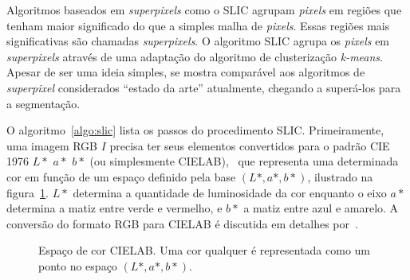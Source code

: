 Algoritmos baseados em \textit{superpixels} como o SLIC agrupam \textit{pixels} em
regiões que tenham maior significado do que a simples malha de
\textit{pixels}. Essas regiões mais significativas são chamadas \textit{superpixels}. O
algoritmo SLIC agrupa os \textit{pixels} em \textit{superpixels}
através de uma adaptação do algoritmo de
clusterização \emph{k-means}. Apesar de ser uma ideia simples, se
mostra comparável aos algoritmos de \textit{superpixel} considerados
``estado da arte'' atualmente, chegando a superá-los para a
segmentação.~\cite{slic}

O algoritmo~\ref{algo:slic} lista os passos do procedimento
SLIC. Primeiramente, uma imagem RGB $I$ precisa ter seus elementos
convertidos para o padrão CIE 1976 $L*$ $a*$ $b*$ (ou simplesmente
CIELAB),~\cite{cielab1} que representa uma determinada cor em função
de um espaço definido pela base $(L*, a*, b*)$, ilustrado na
figura~\ref{fig:cielab}. $L*$ determina a quantidade de luminosidade
da cor enquanto o eixo $a*$ determina a matiz entre verde e vermelho,
e $b*$ a matiz entre azul e amarelo. A conversão do formato RGB para
CIELAB é discutida em detalhes por~\citeauthor{cielab2}.

\begin{figure}[ht!]
\begin{center}
    \caption{Espaço de cor CIELAB. Uma cor qualquer é representada como um ponto
    no espaço $(L*, a*, b*)$.}
  \label{fig:cielab}

  \fonteminha
  \end{center}
\end{figure}

